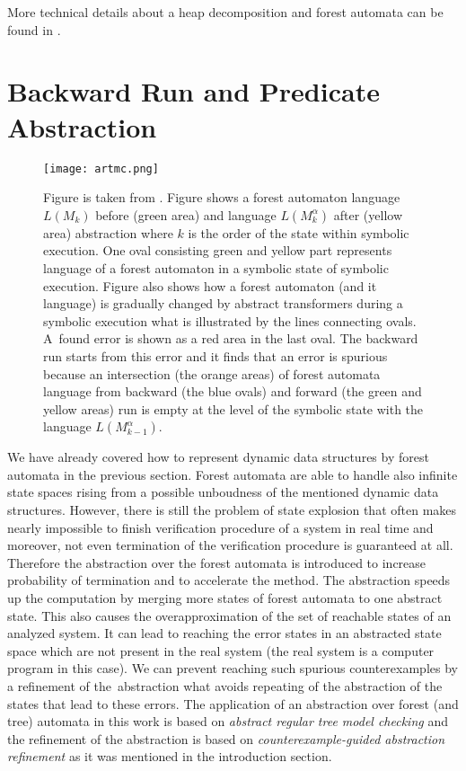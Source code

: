 \documentclass[fleqn,11pt]{ExcelAtFIT} %
\begin{document}
More technical details about a heap decomposition and forest automata can be found in \cite{forester11, forester13}.

\section{Backward Run and Predicate Abstraction}
\label{sec:br}

\begin{figure}[t]
	\centering
	\texttt{[image: artmc.png]}
	\caption{
		Figure is taken from \cite{artmc}.
		Figure shows a forest automaton language $L(M_k)$ before (green area)
		and language $L(M_k^{\alpha})$ after (yellow area) abstraction where
		$k$ is the order of the state within symbolic execution.
		One oval consisting green and yellow part represents
		language of a forest automaton in a symbolic state of symbolic execution.
		Figure also shows how a forest automaton (and it language) is gradually changed
		by abstract transformers during a symbolic execution what is illustrated by the lines connecting ovals.
		A~found error is shown as a red area in the last oval.
		The backward run starts from this error and it finds
		that an error is spurious because an intersection (the orange areas) of forest automata language from backward (the blue ovals)
		and forward (the green and yellow areas) run is empty at the level of the symbolic state with the language $L(M^{\alpha}_{k-1})$.}
	\label{fig:bwrun}
\end{figure}

We have already covered how to represent dynamic data structures by forest automata in the previous section.
Forest automata are able to handle also infinite state spaces
rising from a possible unboudness of the mentioned dynamic data structures.
However, there is still the problem of state explosion that often makes
nearly impossible to finish verification procedure of a system in real time
and moreover, not even termination of the verification procedure is guaranteed at all.
Therefore the abstraction over the forest automata is introduced to increase probability of termination
and to accelerate the method.
The abstraction speeds up the computation by merging more states
of forest automata to one abstract state.
This also causes the overapproximation of the set of reachable
states of an analyzed system.
It can lead to reaching the error states in
an abstracted state space which are not present in the real system (the real system is a computer program in this case).
We can prevent reaching such spurious counterexamples by a refinement of the~abstraction
what avoids repeating of the abstraction of the states that lead to these errors.
The application of an abstraction over forest (and tree) automata in this work is based on \emph{abstract regular tree model checking} \cite{artmc}
and the refinement of the abstraction is based on \emph{counterexample-guided abstraction refinement} \cite{cegar}
as it was mentioned in the introduction section.
\end{document}

